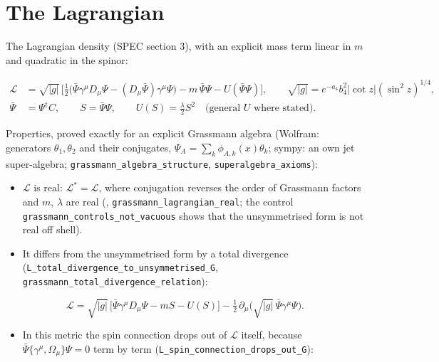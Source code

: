 \documentclass[11pt]{article}
\begin{document}
\section{The Lagrangian}

The Lagrangian density (SPEC section 3), with an explicit mass term linear in $m$ and quadratic in the spinor:

\[
\begin{aligned}
\mathcal{L} &= \sqrt{|g|}\,\Big[\tfrac12\big(\bar\Psi\gamma^\mu D_\mu\Psi - (D_\mu\bar\Psi)\gamma^\mu\Psi\big) - m\,\bar\Psi\Psi - U(\bar\Psi\Psi)\Big], \qquad \sqrt{|g|} = e^{-a_4}b_4^2|\cot z|(\sin^2 z)^{1/4}, \\
\bar\Psi &= \Psi^\dagger C,\qquad S = \bar\Psi\Psi,\qquad U(S) = \tfrac{\lambda}{2}S^2 \quad\text{(general $U$ where stated)}.
\end{aligned}
\]

Properties, proved exactly for an explicit Grassmann algebra (Wolfram: generators $\theta_1, \theta_2$ and their conjugates, $\Psi_A = \sum_k \phi_{A,k}(x)\theta_k$; sympy: an own jet super-algebra; \texttt{grassman\allowbreak{}n\_algebr\allowbreak{}a\_struct\allowbreak{}ure}, \texttt{superalg\allowbreak{}ebra\_axi\allowbreak{}oms}):

\begin{itemize}
\item $\mathcal{L}$ is real: $\mathcal{L}^* = \mathcal{L}$, where conjugation reverses the order of Grassmann factors and $m$, $\lambda$ are real (\texttt{}, \texttt{grassman\allowbreak{}n\_lagran\allowbreak{}gian\_rea\allowbreak{}l}; the control \texttt{grassman\allowbreak{}n\_contro\allowbreak{}ls\_not\_v\allowbreak{}acuous} shows that the unsymmetrised form is not real off shell).
\item It differs from the unsymmetrised form by a total divergence (\texttt{L\_total\_\allowbreak{}divergen\allowbreak{}ce\_to\_un\allowbreak{}symmetri\allowbreak{}sed\_G}, \texttt{grassman\allowbreak{}n\_total\_\allowbreak{}divergen\allowbreak{}ce\_relat\allowbreak{}ion}):
\end{itemize}

\[
\mathcal{L} = \sqrt{|g|}\,\big[\bar\Psi\gamma^\mu D_\mu\Psi - mS - U(S)\big] - \tfrac12\,\partial_\mu\big(\sqrt{|g|}\,\bar\Psi\gamma^\mu\Psi\big).
\]

\begin{itemize}
\item In this metric the spin connection drops out of $\mathcal{L}$ itself, because $\bar\Psi\{\gamma^\mu, \Omega_\mu\}\Psi = 0$ term by term (\texttt{L\_spin\_c\allowbreak{}onnectio\allowbreak{}n\_drops\_\allowbreak{}out\_G}):
\end{itemize}
\end{document}
